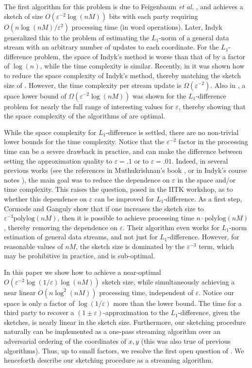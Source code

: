 \documentclass[letterpaper,11pt]{article}
\newcommand{\polylog}{{\mathrm{polylog}}}
\newcommand{\eps}{\varepsilon}
\begin{document}
The first algorithm for this problem is due to Feigenbaum {\it et al.}
\cite{FKSV02}, and achieves a sketch of size $O(\eps^{-2} \log (nM))$
bits with each party requiring $O(n\log (nM)/\eps^2)$ processing
time (in word operations). Later, Indyk \cite{Indyk06} generalized this
to the
problem of estimating the $L_1$-norm of a general data stream with
an arbitrary number of updates to each coordinate. For the
$L_1$-difference problem, the space of Indyk's method is worse than
that of \cite{FKSV02} by a factor of $\log (n)$, while the time
complexity is similar. Recently, in \cite{KNW08} it was shown how to
reduce the space complexity of Indyk's method, thereby matching the
sketch size of \cite{FKSV02}. 
However, the time complexity per stream update 
is $\Omega(\eps^{-2})$. Also in \cite{KNW08}, a space lower
bound of $\Omega(\eps^{-2} \log (nM))$ was shown for the
$L_1$-difference problem for nearly the full range of interesting
values for $\eps$, thereby showing that the space complexity of
the algorithms of \cite{FKSV02, KNW08} are optimal.

While the space complexity for $L_1$-difference is settled, there are
no non-trivial lower bounds for the time complexity. Notice that the
$\eps^{-2}$ factor in the processing time can be a severe drawback in
practice, and can make the difference between setting the
approximation quality to $\eps = .1$ or to $\eps = .01$. Indeed, in
several previous works (see the references in Muthukrishnan's book
\cite{Muthu}, or in Indyk's course notes \cite{IndykCourse}), the main
goal was to reduce the dependence on $\eps$ in the space
and/or time complexity. This raises
the question, posed in the IITK workshop, as to whether this
dependence on $\eps$ can be improved for $L_1$-difference. As a first step, Cormode and
Ganguly \cite{CG07} show that if one increases the sketch size to
$\eps^{-3} \polylog (nM)$, then it is possible to achieve processing
time $n \cdot \polylog (nM)$, thereby removing the dependence on
$\eps$. Their algorithm even works for $L_1$-norm estimation of
general data streams, and not just for $L_1$-difference.
However, for reasonable values of $nM$, the sketch size is
dominated by the $\eps^{-3}$ term, which may be prohibitive in
practice, and is sub-optimal.

In this paper we show how to achieve a near-optimal $O(\eps^{-2}
\log(1/\eps)\log (nM))$ sketch size, while simultaneously achieving
a near linear $O(n \log^2 (nM))$ processing time, independent of $\eps$. Notice our
space is only a
factor of $\log(1/\eps)$ more than the lower bound. The time for a third
party to recover a $(1 \pm \eps)$-approximation to the $L_1$-difference,
given the sketches,
is nearly linear in the sketch size.
Furthermore, our
sketching procedure naturally can be implemented as a one-pass
streaming algorithm over an adversarial ordering of the coordinates of
$x,y$ (this was also true of previous algorithms). 
Thus, up to small
factors, we
resolve the first open question of \cite{IITK}.
We henceforth
describe our sketching procedure as a streaming algorithm.
\end{document}
